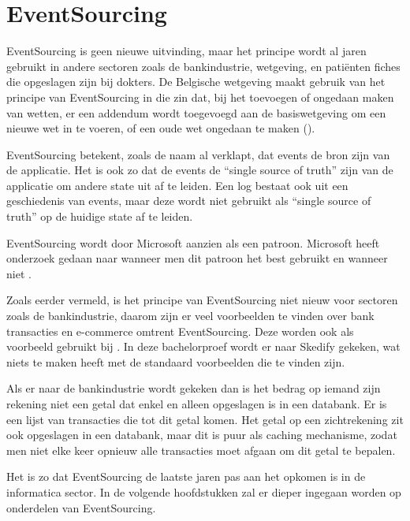 
\chapter{EventSourcing}
\label{ch:eventsourcing}

EventSourcing is geen nieuwe uitvinding, maar het principe wordt al jaren gebruikt in andere sectoren zoals de bankindustrie, wetgeving, en patiënten fiches die opgeslagen zijn bij dokters. De Belgische wetgeving maakt gebruik van het principe van EventSourcing in die zin dat, bij het toevoegen of ongedaan maken van wetten, er een addendum wordt toegevoegd aan de basiswetgeving om een nieuwe wet in te voeren, of een oude wet ongedaan te maken (\cite{belgischewetgeving}).

EventSourcing betekent, zoals de naam al verklapt, dat events de bron zijn van de applicatie. Het is ook zo dat de events de ``single source of truth'' zijn van de applicatie om andere state uit af te leiden. Een log bestaat ook uit een geschiedenis van events, maar deze wordt niet gebruikt als ``single source of truth'' op de huidige state af te leiden.

EventSourcing wordt door Microsoft aanzien als een patroon. Microsoft heeft onderzoek gedaan naar wanneer men dit patroon het best gebruikt en wanneer niet \autocite{Microsoft2017ES}.

Zoals eerder vermeld, is het principe van EventSourcing niet nieuw voor sectoren zoals de bankindustrie, daarom zijn er veel voorbeelden te vinden over bank transacties en e-commerce omtrent EventSourcing. Deze worden ook als voorbeeld gebruikt bij \textcite{Microsoft2017ES}. In deze bachelorproef wordt er naar Skedify gekeken, wat niets te maken heeft met de standaard voorbeelden die te vinden zijn.

Als er naar de bankindustrie wordt gekeken dan is het bedrag op iemand zijn rekening niet een getal dat enkel en alleen opgeslagen is in een databank. Er is een lijst van transacties die tot dit getal komen. Het getal op een zichtrekening zit ook opgeslagen in een databank, maar dit is puur als \gls{caching} mechanisme, zodat men niet elke keer opnieuw alle transacties moet afgaan om dit getal te bepalen.

Het is zo dat EventSourcing de laatste jaren pas aan het opkomen is in de informatica sector. In de volgende hoofdstukken zal er dieper ingegaan worden op onderdelen van EventSourcing.